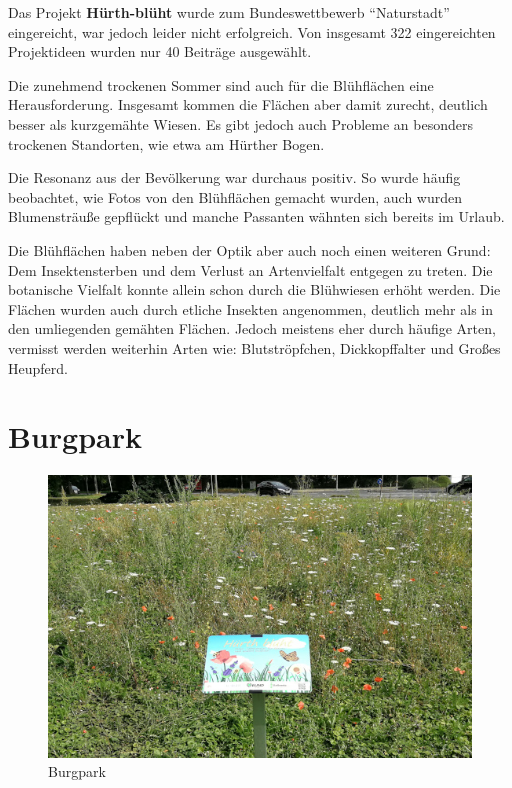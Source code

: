 \documentclass[10pt]{article}
\begin{document}
Das Projekt \textbf{Hürth-blüht} wurde zum Bundeswettbewerb "`Naturstadt"' eingereicht, war jedoch leider nicht erfolgreich. Von insgesamt 322 eingereichten Projektideen wurden nur 40 Beiträge ausgewählt.

Die zunehmend trockenen Sommer sind auch für die Blühflächen eine Herausforderung. Insgesamt kommen die Flächen aber damit zurecht, deutlich besser als kurzgemähte Wiesen.
Es gibt jedoch auch Probleme an besonders trockenen Standorten, wie etwa am Hürther Bogen.

Die Resonanz aus der Bevölkerung war durchaus positiv. So wurde häufig beobachtet, wie Fotos von den Blühflächen gemacht wurden, auch wurden Blumensträuße gepflückt und manche Passanten wähnten sich bereits im Urlaub.

Die Blühflächen haben neben der Optik aber auch noch einen weiteren Grund: Dem Insektensterben und dem Verlust an Artenvielfalt entgegen zu treten. Die botanische Vielfalt konnte allein schon durch die Blühwiesen erhöht werden. Die Flächen wurden auch durch etliche Insekten angenommen, deutlich mehr als in den umliegenden gemähten Flächen. Jedoch meistens eher durch häufige Arten, vermisst werden weiterhin Arten wie: Blutströpfchen, Dickkopffalter und Großes Heupferd.


\newpage

\section{Burgpark}

\begin{figure}[h!]
  \includegraphics[width=\linewidth]{img/infotafeln.jpg}
  \caption{Burgpark}
\end{figure}
\end{document}
